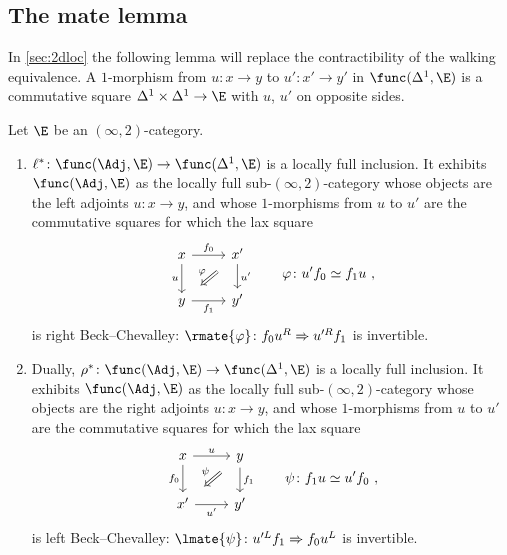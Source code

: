 \subsection{The mate lemma}
\label{subsec:mates-lemma}

In \cref{sec:2dloc} the following lemma will replace the contractibility of the walking equivalence.
A $1$-morphism from $u\colon x \to y$ to $u'\colon x' \to y'$ in $\func(\Delta^{1},\E)$ is a commutative square $\Delta^{1} \times \Delta^{1} \to \E$ with $u$, $u'$ on opposite sides.

\begin{lem}[mates]
\label{lem:mates}
Let $\E$ be an $(\infty,2)$-category.
\begin{enumerate}
\item $\ell^{*}\colon \func(\Adj,\E) \to \func(\Delta^{1},\E)$ is a locally full inclusion. It exhibits $\func(\Adj,\E)$ as the locally full sub-$(\infty,2)$-category whose objects are the left adjoints $u\colon x \to y$, and whose $1$-morphisms from $u$ to $u'$ are the commutative squares for which the lax square
\[
\begin{tikzcd}
x \ar[r, "f_{0}"] \ar[d, "u"'] & x' \ar[d, "u'"] \ar[dl, Rightarrow, shorten=3mm, "\varphi"'] \\
y \ar[r, "f_{1}"'] & y'
\end{tikzcd}
\qquad \varphi\colon u'f_{0} \simeq f_{1}u \ ,
\]
is right Beck--Chevalley: $\rmate{\varphi}\colon f_{0}u^{R} \Rightarrow u'^{R}f_{1}$ is invertible.
\item Dually, $\rho^{*}\colon \func(\Adj,\E) \to \func(\Delta^{1},\E)$ is a locally full inclusion. It exhibits $\func(\Adj,\E)$ as the locally full sub-$(\infty,2)$-category whose objects are the right adjoints $u\colon x \to y$, and whose $1$-morphisms from $u$ to $u'$ are the commutative squares for which the lax square
\[
\begin{tikzcd}
x \ar[r, "u"] \ar[d, "f_{0}"'] & y \ar[d, "f_{1}"] \ar[dl, Rightarrow, shorten=3mm, "\psi"'] \\
x' \ar[r, "u'"'] & y'
\end{tikzcd}
\qquad \psi\colon f_{1}u \simeq u'f_{0} \ ,
\]
is left Beck--Chevalley: $\lmate{\psi}\colon u'^{L}f_{1} \Rightarrow f_{0}u^{L}$ is invertible.
\end{enumerate}
\end{lem}

